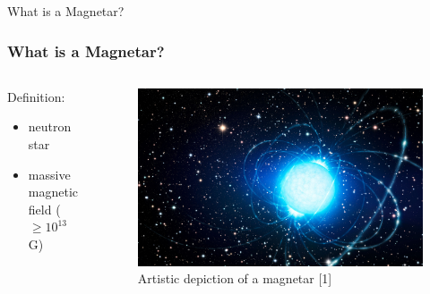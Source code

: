 \documentclass[hyperref=pdftex, presentation]{beamer}
\begin{document}
\begin{frame}{\Large What is a Magnetar?}
\frametitle{\Large What is a Magnetar?}

\begin{minipage}[0.2\textheight]{\textwidth}
\begin{columns}[T]
\begin{column}{0.5\textwidth}

\begin{block}{Definition:}

\begin{itemize}
 \item<2-> neutron star%
 \item<3-> massive magnetic field ($\ge 10^{13}$ G)
\end{itemize}
\end{block}

\end{column}
\begin{column}{0.5\textwidth}
	\begin{figure}
		\includegraphics[scale=.09]{figures/magnetar_art.jpg}
		\caption{Artistic depiction of a magnetar [1]}
	\end{figure}
\end{column}
\end{columns}
\end{minipage}

\end{frame}
\end{document}
